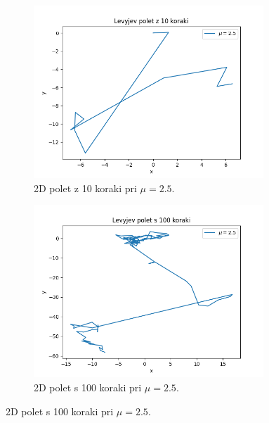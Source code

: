 \documentclass[a4paper, 12pt, slovene]{article}
\begin{document}
\begin{figure}[H]
\begin{subfigure}{0.49\textwidth}
	\centering
	\includegraphics[width=0.95\textwidth]{sprehodi/let-10-2.5.png}
	\caption{2D polet z 10 koraki pri $\mu = 2.5$.}
	\label{fig-let-10-2.5}
\end{subfigure}
\begin{subfigure}{0.49\textwidth}
	\centering
	\includegraphics[width=0.95\textwidth]{sprehodi/let-100-2.5.png}
	\caption{2D polet s 100 koraki pri $\mu = 2.5$.}
	\label{fig-let-100-2.5}
\end{subfigure}
\end{figure}
\end{document}
